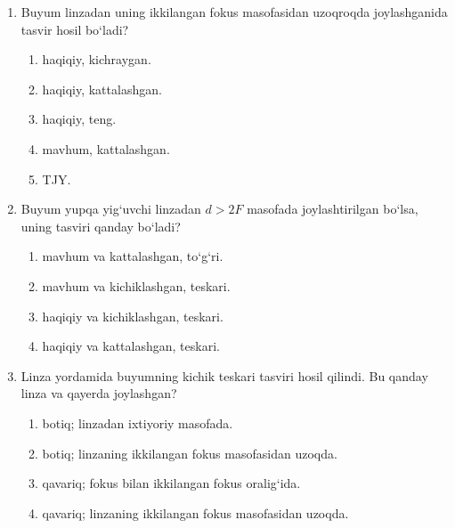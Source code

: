\begin{enumerate}
\begin{enumerate}[label=\Alph*)]
\item mavhum va kattalashgan.
\item mavhum va kichiklashgan.
\item mavhum va teskari.
\item haqiqiy va kichiklashgan.
\item haqiqiy va kattalashgan.
\end{enumerate}

\item Buyum linzadan uning ikkilangan fokus masofasidan uzoqroqda joylashganida tasvir hosil bo‘ladi?

\begin{enumerate}[label=\Alph*)]
\item haqiqiy, kichraygan.
\item haqiqiy, kattalashgan.
\item haqiqiy, teng.
\item mavhum, kattalashgan.
\item TJY.
\end{enumerate}

\item Buyum yupqa yig‘uvchi linzadan $d>2F$ masofada joylashtirilgan bo‘lsa, uning tasviri qanday bo‘ladi?

\begin{enumerate}[label=\Alph*)]
\item mavhum va kattalashgan, to‘g‘ri.
\item mavhum va kichiklashgan, teskari.
\item haqiqiy va kichiklashgan, teskari.
\item haqiqiy va kattalashgan, teskari.
\end{enumerate}

\item Linza yordamida buyumning kichik teskari tasviri hosil qilindi. Bu qanday linza va qayerda joylashgan?

\begin{enumerate}[label=\Alph*)]
\item botiq; linzadan ixtiyoriy masofada.
\item botiq; linzaning ikkilangan fokus masofasidan uzoqda.
\item qavariq; fokus bilan ikkilangan fokus oralig‘ida.
\item qavariq; linzaning ikkilangan fokus masofasidan uzoqda.
\end{enumerate}


\end{enumerate}
